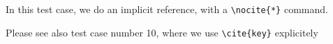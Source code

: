 \documentclass{article}
\begin{document}
\noindent In this test case, we do an implicit reference, with a \verb+\nocite{*}+ command. \nocite{*}
\bigskip

\noindent
Please see also test case number 10, where we use \verb+\cite{key}+ explicitely

\printbibliography
\end{document}
